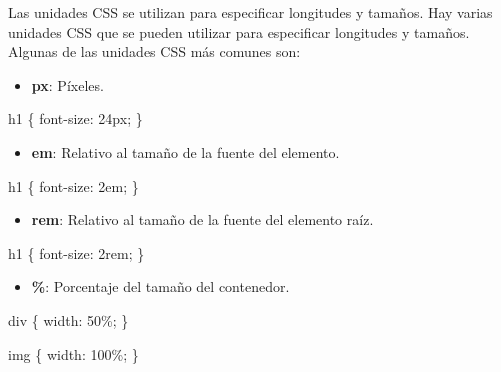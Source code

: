 \documentclass[
  a4paper,
  DIV=11,
  numbers=noendperiod,
  onepage,
  openany]{scrreprt}
\newenvironment{Shaded}{\begin{snugshade}}{\end{snugshade}}
\newcommand{\DataTypeTok}[1]{\textcolor[rgb]{0.68,0.00,0.00}{#1}}
\newcommand{\DecValTok}[1]{\textcolor[rgb]{0.68,0.00,0.00}{#1}}
\newcommand{\KeywordTok}[1]{\textcolor[rgb]{0.00,0.23,0.31}{#1}}
\newcommand{\NormalTok}[1]{\textcolor[rgb]{0.00,0.23,0.31}{#1}}
\newcommand{\OperatorTok}[1]{\textcolor[rgb]{0.37,0.37,0.37}{#1}}
\providecommand{\tightlist}{%
  \setlength{\itemsep}{0pt}\setlength{\parskip}{0pt}}\usepackage{longtable,booktabs,array}
\begin{document}
Las unidades CSS se utilizan para especificar longitudes y tamaños. Hay
varias unidades CSS que se pueden utilizar para especificar longitudes y
tamaños. Algunas de las unidades CSS más comunes son:

\begin{itemize}
\tightlist
\item
  \textbf{px}: Píxeles.
\end{itemize}

\begin{Shaded}
\begin{Highlighting}[]
\NormalTok{h1 \{}
  \KeywordTok{font{-}size}\NormalTok{: }\DecValTok{24}\DataTypeTok{px}\OperatorTok{;}
\NormalTok{\}}
\end{Highlighting}
\end{Shaded}

\begin{itemize}
\tightlist
\item
  \textbf{em}: Relativo al tamaño de la fuente del elemento.
\end{itemize}

\begin{Shaded}
\begin{Highlighting}[]
\NormalTok{h1 \{}
  \KeywordTok{font{-}size}\NormalTok{: }\DecValTok{2}\DataTypeTok{em}\OperatorTok{;}
\NormalTok{\}}
\end{Highlighting}
\end{Shaded}

\begin{itemize}
\tightlist
\item
  \textbf{rem}: Relativo al tamaño de la fuente del elemento raíz.
\end{itemize}

\begin{Shaded}
\begin{Highlighting}[]
\NormalTok{h1 \{}
  \KeywordTok{font{-}size}\NormalTok{: }\DecValTok{2}\DataTypeTok{rem}\OperatorTok{;}
\NormalTok{\}}
\end{Highlighting}
\end{Shaded}

\begin{itemize}
\tightlist
\item
  \textbf{\%}: Porcentaje del tamaño del contenedor.
\end{itemize}

\begin{Shaded}
\begin{Highlighting}[]
\NormalTok{div \{}
  \KeywordTok{width}\NormalTok{: }\DecValTok{50}\DataTypeTok{\%}\OperatorTok{;}
\NormalTok{\}}

\NormalTok{img \{}
  \KeywordTok{width}\NormalTok{: }\DecValTok{100}\DataTypeTok{\%}\OperatorTok{;}
\NormalTok{\}}
\end{Highlighting}
\end{Shaded}
\end{document}
